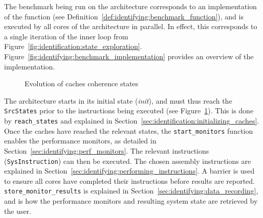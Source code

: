The benchmark being run on the architecture corresponds to an implementation of
the \benchmark{} function (see
Definition~\ref{def:identifying:benchmark_function}), and is executed by all
cores of the architecture in parallel. In effect, this corresponds to a single
iteration of the inner loop from
Figure~\ref{fig:identification:state_exploration}.
Figure~\ref{fig:identifying:benchmark_implementation} provides an overview of
the \benchmark{} implementation.

\begin{figure}[hbt!]
\begin{center}
\end{center}
\caption{Evolution of caches coherence states}
\label{fig:identifying:cache_state_evol}
\end{figure}

The architecture starts in its initial state (\emph{init}), and must thus reach
the \lstinline!SrcStates! prior to the instructions being executed (see
Figure~\ref{fig:identifying:cache_state_evol}). This is done by
\lstinline!reach_states! and explained in
Section~\ref{sec:identification:initializing_caches}. Once the caches have
reached the relevant states, the \lstinline!start_monitors! function enables the
performance monitors, as detailed in
Section~\ref{sec:identifying:perf_monitors}. The relevant instructions
(\lstinline!SysInstruction!) can then be executed. The chosen assembly
instructions are explained in
Section~\ref{sec:identifying:performing_instructions}. A barrier is used to
ensure all cores have completed their instructions before results are reported.
\lstinline!store_monitor_results! is explained in
Section~\ref{sec:identifying:data_recording}, and is how the performance
monitors and resulting system state are retrieved by the user.

